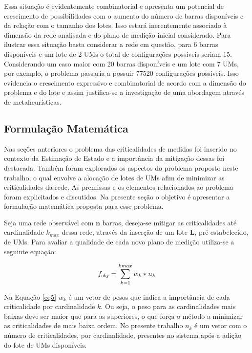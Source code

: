 \documentclass[12pt]{article}
\begin{document}
	Essa situação é evidentemente combinatorial e apresenta um potencial de crescimento de possibilidades com o aumento do número de barras disponíveis e da relação com o tamanho dos lotes. Isso estará inerentemente associado à dimensão da rede analisada e do plano de medição inicial considerado. Para ilustrar essa situação basta considerar a rede em questão, para 6 barras disponíveis e um lote de 2 UMs o total de configurações possíveis seriam 15. Considerando um caso maior com 20 barras disponíveis e um lote com 7 UMs, por exemplo, o problema passaria a possuir 77520 configurações possíveis. Isso evidencia o crescimento expressivo e combinatorial de acordo com a dimensão do problema e do lote e assim justifica-se a investigação de uma abordagem através de metaheurísticas.
	

\subsection{Formulação Matemática}	

Nas seções anteriores o problema das criticalidades de medidas foi inserido no contexto da Estimação de Estado e a importância da mitigação dessas foi destacada. Também foram explorados os aspectos do problema proposto neste trabalho, o qual envolve a alocação de lotes de UMs afim de minimizar as criticalidades da rede. As premissas e os elementos relacionados ao problema foram explicitados e discutidos. Na presente seção o objetivo é apresentar a formulação matemática proposta para esse problema.

Seja uma rede observável com $\mathbf{n}$ barras, deseja-se mitigar as criticalidades até cardinalidade $k_{max}$ dessa rede, através da inserção de um lote $\mathbf{L}$, pré-estabelecido, de UMs. Para avaliar a qualidade de cada novo plano de medição utiliza-se a seguinte equação:
	
	\begin{equation}
		f_{obj} =  \sum_{k=1}^{kmax}w_k*n_k	\\	
		\label{eq5}
	\end{equation}
	
Na Equação \ref{eq5}  $w_k$ é um vetor de pesos que indica a importância de cada criticalidade por cardinalidade $k$. Ou seja, o peso para as cardinalidades mais baixas deve ser maior que para as superiores, o que força o método a minimizar as criticalidades de mais baixa ordem. No presente trabalho $n_k$ é um vetor com o número de criticalidades, por cardinalidade, presentes no sistema após a adição do lote de UMs disponíveis.
\end{document}
